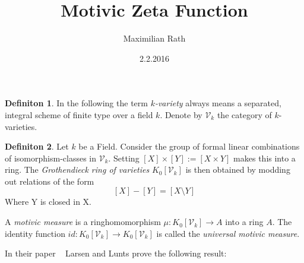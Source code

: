 \documentclass[a4paper]{article}
\author{Maximilian Rath}
\date{2.2.2016}
\title{Motivic Zeta Function}
\theoremstyle{plain}
\theoremstyle{definition}
\newtheorem{definition}{Definiton}
\begin{document}
\maketitle

\begin{definition}
    In the following the term \emph{$k$-variety} always means a separated, integral scheme of finite type over a field $k$.
    Denote by $\mathcal{V}_k$ the category of $k$-varieties.
\end{definition}

\begin{definition}
    Let $k$ be a Field. Consider the group of formal linear combinations of isomorphism-classes in $\mathcal{V}_k$.
    Setting $[X] \times [Y] := [X \times Y]$ makes this into a ring.
    The \emph{Grothendieck ring of varieties} $K_0[\mathcal{V}_k]$ is then obtained by modding out relations of the form
    \[
        [X] - [Y] = [X \setminus Y]
    \]
    Where Y is closed in X.

    A \emph{motivic measure} is a ringhomomorphism $\mu: K_0[\mathcal{V}_k] \to A$ into a ring $A$. The identity function
    $id: K_0[\mathcal{V}_k] \to K_0[\mathcal{V}_k]$ is called the \emph{universal motivic measure}.
\end{definition}
In their paper ~\cite{MR1996804} Larsen and Lunts prove the following result:

{}

\end{document}

